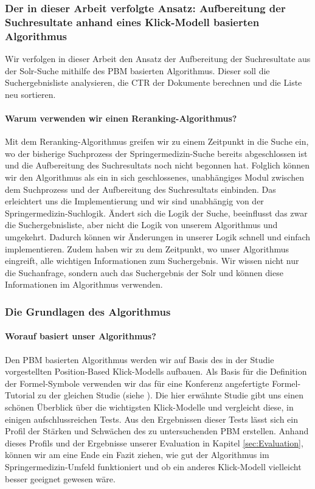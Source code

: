 \subsubsection{Der in dieser Arbeit verfolgte Ansatz: Aufbereitung der Suchresultate anhand eines Klick-Modell basierten Algorithmus}
\label{sec:Grundlagen:Grundbegriffe:Result-RerankingPBM:AnsatzSucheEinbinden}

Wir verfolgen in dieser Arbeit den Ansatz der Aufbereitung der Suchresultate aus der Solr-Suche mithilfe des PBM basierten Algorithmus. Dieser soll die Suchergebnisliste analysieren, die CTR der Dokumente berechnen und die Liste neu sortieren. 

\paragraph{Warum verwenden wir einen Reranking-Algorithmus?}
Mit dem Reranking-Algorithmus greifen wir zu einem Zeitpunkt in die Suche ein, wo der bisherige Suchprozess der Springermedizin-Suche bereits abgeschlossen ist und die Aufbereitung des Suchresultats noch nicht begonnen hat. Folglich können wir den Algorithmus als ein in sich geschlossenes, unabhängiges Modul zwischen dem Suchprozess und der Aufbereitung des Suchresultats einbinden. Das erleichtert uns die Implementierung und wir sind unabhängig von der Springermedizin-Suchlogik. Ändert sich die Logik der Suche, beeinflusst das zwar die Suchergebnisliste, aber nicht die Logik von unserem Algorithmus und umgekehrt. Dadurch können wir Änderungen in unserer Logik schnell und einfach implementieren. Zudem haben wir zu dem Zeitpunkt, wo unser Algorithmus eingreift, alle wichtigen Informationen zum Suchergebnis. Wir wissen nicht nur die Suchanfrage, sondern auch das Suchergebnis der Solr und können diese Informationen im Algorithmus verwenden.

\subsubsection{Die Grundlagen des Algorithmus}
\label{sec:Grundlagen:Grundbegriffe:Result-RerankingPBM:Grundlagen}

\paragraph{Worauf basiert unser Algorithmus?}
Den PBM basierten Algorithmus werden wir auf Basis des in der Studie \cite{pbm} vorgestellten Position-Based Klick-Modells aufbauen. Als Basis für die Definition der Formel-Symbole verwenden wir das für eine Konferenz angefertigte Formel-Tutorial zu der gleichen Studie (siehe \cite{pbmTutorial}). Die hier erwähnte Studie gibt uns einen schönen Überblick über die wichtigsten Klick-Modelle und vergleicht diese, in einigen aufschlussreichen Tests. Aus den Ergebnissen dieser Tests lässt sich ein Profil der Stärken und Schwächen des zu untersuchenden PBM erstellen. Anhand dieses Profils und der Ergebnisse unserer Evaluation in Kapitel \ref{sec:Evaluation}, können wir am eine Ende ein Fazit ziehen, wie gut der Algorithmus im Springermedizin-Umfeld funktioniert und ob ein anderes Klick-Modell vielleicht besser geeignet gewesen wäre.


